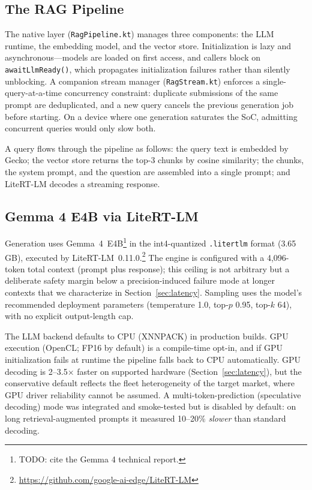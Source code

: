 \subsection{The RAG Pipeline}

The native layer (\texttt{RagPipeline.kt}) manages three components: the
LLM runtime, the embedding model, and the vector store. Initialization
is lazy and asynchronous---models are loaded on first access, and
callers block on \texttt{awaitLlmReady()}, which propagates
initialization failures rather than silently unblocking. A companion
stream manager (\texttt{RagStream.kt}) enforces a single-query-at-a-time
concurrency constraint: duplicate submissions of the same prompt are
deduplicated, and a new query cancels the previous generation job before
starting. On a device where one generation saturates the SoC, admitting
concurrent queries would only slow both.

A query flows through the pipeline as follows: the query text is
embedded by Gecko; the vector store returns the top-3 chunks by cosine
similarity; the chunks, the system prompt, and the question are
assembled into a single prompt; and LiteRT-LM decodes a streaming
response.

\subsection{Gemma 4 E4B via LiteRT-LM}

Generation uses Gemma~4~E4B\footnote{TODO: cite the Gemma 4 technical
report.} in the int4-quantized \texttt{.litertlm} format (3.65\,GB),
executed by LiteRT-LM~0.11.0.\footnote{\url{https://github.com/google-ai-edge/LiteRT-LM}}
The engine is configured with a 4{,}096-token total context (prompt plus
response); this ceiling is not arbitrary but a deliberate safety margin
below a precision-induced failure mode at longer contexts that we
characterize in Section~\ref{sec:latency}. Sampling uses the model's
recommended deployment parameters (temperature 1.0, top-$p$ 0.95,
top-$k$ 64), with no explicit output-length cap.

The LLM backend defaults to CPU (XNNPACK) in production builds. GPU
execution (OpenCL; FP16 by default) is a compile-time opt-in, and if GPU
initialization fails at runtime the pipeline falls back to CPU
automatically. GPU decoding is 2--3.5$\times$ faster on supported
hardware (Section~\ref{sec:latency}), but the conservative default
reflects the fleet heterogeneity of the target market, where GPU driver
reliability cannot be assumed. A multi-token-prediction (speculative
decoding) mode was integrated and smoke-tested but is disabled by
default: on long retrieval-augmented prompts it measured 10--20\%
\emph{slower} than standard decoding.

